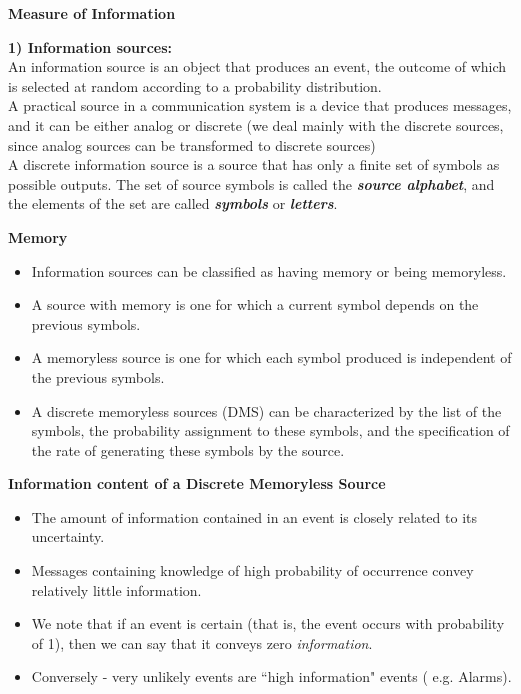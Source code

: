 \documentclass[]{article}
\begin{document}
\noindent \textbf{Measure of Information}

\textbf{1) Information sources:}\\

An information source is an object that produces an event, the outcome of which is selected at
random according to a probability distribution.  \\ \bigskip A practical source in a communication system is a
device that produces messages, and it can be either analog or discrete (we deal mainly
with the discrete sources, since analog sources can be transformed to discrete sources) \\ \bigskip A discrete information source is a
source that has only a finite set of symbols as possible outputs. The set of source symbols is called the
\textbf{\emph{source alphabet}}, and the elements of the set are called \textbf{\emph{ symbols}} or \textbf{\emph{letters}}.


\noindent \textbf{Memory}
\begin{itemize} \item Information sources can be classified as having memory or being memoryless.
\item A source with
memory is one for which a current symbol depends on the previous symbols.\item A memoryless source is
one for which each symbol produced is independent of the previous symbols.

\item A discrete memoryless sources (DMS) can be characterized by the list of the symbols, the
probability assignment to these symbols, and the specification of the rate of generating these symbols by the source.\end{itemize}



\noindent \textbf{Information content of a Discrete Memoryless Source}
\begin{itemize}
\item The amount of information contained in an event is closely related to its uncertainty.
\item Messages containing knowledge of high probability of occurrence convey relatively little information.

\item We note that if an event is certain (that is, the event occurs with probability of 1), then we can say that it conveys zero \textit{information}.

\item Conversely - very unlikely events are ``high information" events ( e.g. Alarms).
\end{itemize}
\end{document}
